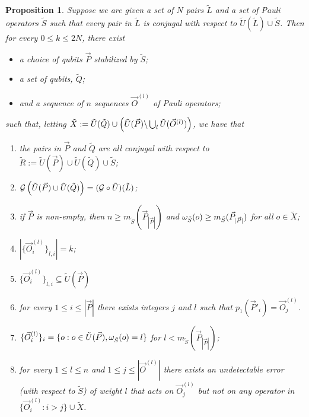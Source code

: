 \documentclass[twocolumn,showpacs,preprintnumbers,amsmath,amssymb,nofootinbib,pra,floatfix]{revtex4-1}
\newtheorem{proposition}{Proposition}
\newcommand{\lst}{\vec}
\newcommand{\set}{\tilde}
\newcommand{\genfun}{\mathcal{G}}
\begin{document}
\begin{proposition}
Suppose we are given a set of $N$ pairs $\set L$ and a set of Pauli operators $\set S$ such that every pair in $\set L$ is conjugal with respect to $\set U(\set L)\cup\set S$.  Then for every $0\le k \le 2N$, there exist
\begin{itemize}
\item a choice of qubits $\lst P$ stabilized by $\set S$;
\item a set of qubits, $\set Q$;
\item and a sequence of $n$ sequences $\lst O^{(l)}$ of Pauli operators;
\end{itemize}
such that, letting $\set X:=\set U(\set Q) \cup \paren{\set U(\lst P) \backslash \bigcup_l \set U(\lst O^{(l)})}$, we have that
\begin{enumerate}
\item \label{pairs are all conjugal to R} the pairs in $\lst P$ and $\set Q$ are all conjugal with respect to $\set R := \set U(\lst P)\cup \set U(\set Q)\cup \set S$;
\item $\genfun\paren{\set U(\lst P)\cup \set U(\set Q)}=(\genfun\circ\set U)(\set L)$;
\item \label{nothing smaller in Q} if $\lst P$ is non-empty, then $n \ge m_{\set S}(\lst P_{|\lst P|})$ and $\om_{\set S}(o)\ge m_{\set S}(\lst P_{|\lst P|})$ for all $o\in\set X$;
\item $\left|\{\lst O^{(l)}_i\}_{l,i}\right| = k$;
\item \label{certificate is subset of the choice of qubits} $\{\lst O^{(l)}_i\}_{l,i}\subseteq \set U(\lst P)$
\item \label{all first pairs are present in the certificate} for every $1 \le i \le |\lst P|$ there exists integers $j$ and $l$ such that $p_1(\lst P'_i)=\lst O^{(l)}_j$.
\item \label{O has the certificate property} $\{\lst O^{(l)}_i\}_i=\{o:o\in\set U(\lst P), \om_{\set S}(o)=l\}$ for $l<m_{\set S}(\lst P_{|\lst P|})$;
\item \label{O has the certificate property, extending to X} for every $1\le l\le n$ and $1 \le j \le |\lst O^{(l)}|$ there exists an undetectable error (with respect to $\set S$) of weight $l$ that acts on $\lst O^{(l)}_j$ but not on any operator in $\{\lst O^{(l)}_i : i > j\} \cup \set X$.
\end{enumerate}
\end{proposition}
\end{document}
